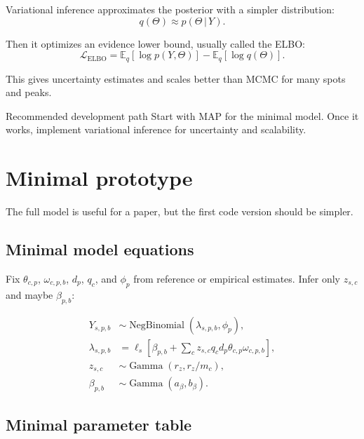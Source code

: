 \documentclass[11pt]{article}
\newcommand{\NB}{\operatorname{NegBinomial}}
\newcommand{\Gam}{\operatorname{Gamma}}
\newcommand{\E}{\mathbb{E}}
\newcommand{\given}{\,|\,}
\begin{document}
Variational inference approximates the posterior with a simpler distribution:
\[
q(\Theta) \approx p(\Theta\given Y).
\]

Then it optimizes an evidence lower bound, usually called the ELBO:
\[
\mathcal{L}_{\mathrm{ELBO}}
= \E_q[\log p(Y,\Theta)] - \E_q[\log q(\Theta)].
\]

This gives uncertainty estimates and scales better than MCMC for many spots and peaks.

\begin{plainbox}{Recommended development path}
Start with MAP for the minimal model.  Once it works, implement variational inference for uncertainty and scalability.
\end{plainbox}

\section{Minimal prototype}

The full model is useful for a paper, but the first code version should be simpler.

\subsection{Minimal model equations}

Fix \(\theta_{c,p}\), \(\omega_{c,p,b}\), \(d_p\), \(q_c\), and \(\phi_p\) from reference or empirical estimates.  Infer only \(z_{s,c}\) and maybe \(\beta_{p,b}\):

\begin{align}
Y_{s,p,b} &\sim \NB(\lambda_{s,p,b},\phi_p),\\
\lambda_{s,p,b} &= \ell_s\left[\beta_{p,b}+\sum_c z_{s,c} q_c d_p\theta_{c,p}\omega_{c,p,b}\right],\\
z_{s,c} &\sim \Gam(r_z,r_z/m_c),\\
\beta_{p,b} &\sim \Gam(a_\beta,b_\beta).
\end{align}

\subsection{Minimal parameter table}
\end{document}
